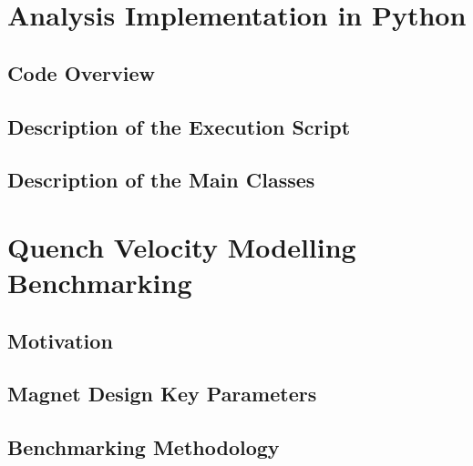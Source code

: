 \documentclass[11pt,a4paper]{report}
\begin{document}
\clearpage
\chapter{Analysis Implementation in Python}
\label{chapter:python_implementation}

\section{Code Overview}
\label{section:code_overview}


\section{Description of the Execution Script}


\section{Description of the Main Classes}
\label{section:description_main_classes}


\clearpage
\chapter{Quench Velocity Modelling Benchmarking}
\label{chapter:quench_velocity_benchmarking}

\section{Motivation}


\section{Magnet Design Key Parameters}


\section{Benchmarking Methodology}
\label{section:quench_velocity_benchmarking_benchmarking_methodology}

\end{document}
